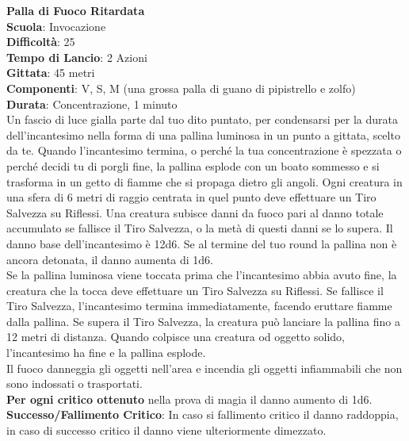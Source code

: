 \begin{multicols}{2}
\medskip\textbf{Palla di Fuoco Ritardata}\\
\textbf{Scuola}: Invocazione\\
\textbf{Difficoltà}: 25\\
\textbf{Tempo di Lancio}: 2 Azioni\\
\textbf{Gittata}: 45 metri\\
\textbf{Componenti}: V, S, M (una grossa palla di guano di pipistrello e zolfo)\\
\textbf{Durata}: Concentrazione, 1 minuto\\
Un fascio di luce gialla parte dal tuo dito puntato, per condensarsi per la durata dell'incantesimo nella forma di una pallina luminosa in un punto a gittata, scelto da te. Quando l'incantesimo termina, o perché la tua concentrazione è spezzata o perché decidi tu di porgli fine, la pallina esplode con un boato sommesso e si trasforma in un getto di fiamme che si propaga dietro gli angoli. Ogni creatura in una sfera di 6 metri di raggio centrata in quel punto deve effettuare un Tiro Salvezza su Riflessi. Una creatura subisce danni da fuoco pari al danno totale accumulato se fallisce il Tiro Salvezza, o la metà di questi danni se lo supera. Il danno base dell'incantesimo è 12d6. Se al termine del tuo round la pallina non è ancora detonata, il danno aumenta di 1d6.\\
Se la pallina luminosa viene toccata prima che l'incantesimo abbia avuto fine, la creatura che la tocca deve effettuare un Tiro Salvezza su Riflessi. Se fallisce il Tiro Salvezza, l'incantesimo termina immediatamente, facendo eruttare fiamme dalla pallina. Se supera il Tiro Salvezza, la creatura può lanciare la pallina fino a 12 metri di distanza. Quando colpisce una creatura od oggetto solido, l'incantesimo ha fine e la pallina esplode.\\
Il fuoco danneggia gli oggetti nell'area e incendia gli oggetti infiammabili che non sono indossati o trasportati.\\
\textbf{Per ogni critico ottenuto} nella prova di magia il danno aumento di 1d6.\\
\textbf{Successo/Fallimento Critico}: In caso si fallimento critico il danno raddoppia, in caso di successo critico il danno viene ulteriormente dimezzato.


\end{multicols}
